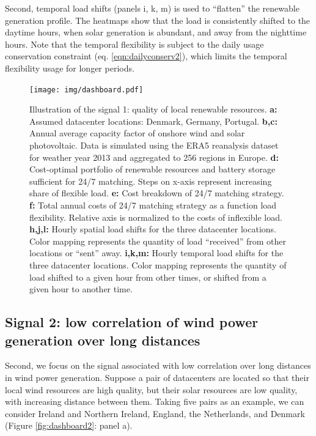 Second, temporal load shifts (panels i, k, m) is used to \enquote{flatten} the renewable generation profile. The heatmaps show that the load is consistently shifted to the daytime hours, when solar generation is abundant, and away from the nighttime hours. Note that the temporal flexibility is subject to the daily usage conservation constraint (eq. \ref{eqn:dailyconserv2}), which limits the temporal flexibility usage for longer periods.


\begin{figure}
    \centering
    \texttt{[image: img/dashboard.pdf]}
    \caption{Illustration of the signal 1: quality of local renewable resources.
        \textbf{a:} Assumed datacenter locations: Denmark, Germany, Portugal.
        \textbf{b,c:} Annual average capacity factor of onshore wind and solar photovoltaic. Data is simulated using the ERA5 reanalysis dataset for weather year 2013 and aggregated to 256 regions in Europe.
        \textbf{d:} Cost-optimal portfolio of renewable resources and battery storage sufficient for 24/7 matching. Steps on x-axis represent increasing share of flexible load.
        \textbf{e:} Cost breakdown of 24/7 matching strategy.
        \textbf{f:} Total annual costs of 24/7 matching strategy as a function load flexibility. Relative axis is normalized to the costs of inflexible load.
        \textbf{h,j,l:} Hourly spatial load shifts for the three datacenter locations. Color mapping represents the quantity of load \enquote{received} from other locations or \enquote{sent} away.
        \textbf{i,k,m:} Hourly temporal load shifts for the three datacenter locations. Color mapping represents the quantity of load shifted to a given hour from other times, or shifted from a given hour to another time.}
    \label{fig:dashboard1}
\end{figure}


\subsection{Signal 2: low correlation of wind power generation over long distances}

Second, we focus on the signal associated with low correlation over long distances in wind power generation. Suppose a pair of datacenters are located so that their local wind resources are high quality, but their solar resources are low quality, with increasing distance between them. Taking five pairs as an example, we can consider Ireland and Northern Ireland, England, the Netherlands, and Denmark (Figure \ref{fig:dashboard2}: panel a).

